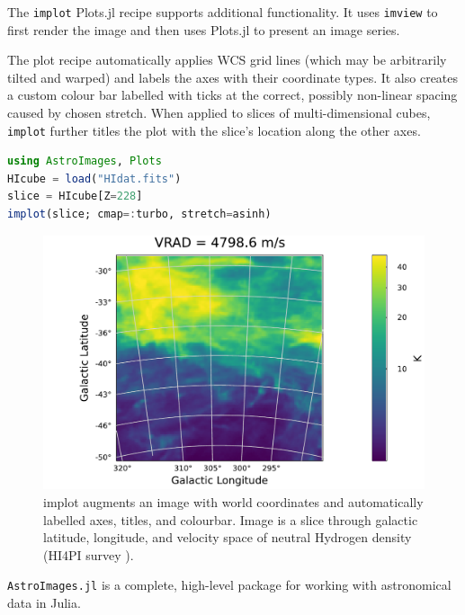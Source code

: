 \documentclass{juliacon}
\begin{document}
The \verb|implot| Plots.jl recipe supports additional functionality. It uses \verb|imview| to first render the image and then uses Plots.jl to present an image series.

The plot recipe automatically applies WCS grid lines (which may be arbitrarily tilted and warped) and labels the axes with their coordinate types. It also creates a custom colour bar labelled with ticks at the correct, possibly non-linear spacing caused by chosen stretch.
When applied to slices of multi-dimensional cubes, \verb|implot| further titles the plot with the slice's location along the other axes.

\begin{lstlisting}[language = Julia]
using AstroImages, Plots
HIcube = load("HIdat.fits")
slice = HIcube[Z=228]
implot(slice; cmap=:turbo, stretch=asinh)
\end{lstlisting}
\vspace{-0.5cm}
\begin{figure}[hbt!]
    \centerline{\includegraphics[width=\columnwidth]{hidatplot.pdf}}
    \caption{implot augments an image with world coordinates and automatically labelled axes, titles, and colourbar. Image is a slice through galactic latitude, longitude, and velocity space of neutral Hydrogen density (HI4PI survey \cite{2016A&A...594A.116H}).}
      \label{fig:cube-slice}
\end{figure}
\FloatBarrier 

\verb|AstroImages.jl| is a complete, high-level package for working with astronomical data in Julia.




\end{document}
